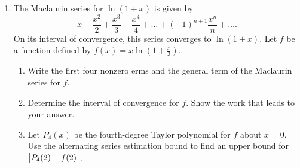 \begin{enumerate}
	\item The Maclaurin series for $\ln{(1+x)}$ is given by
		\begin{equation*}
			x - \frac{x^2}{2} + \frac{x^3}{3} - \frac{x^4}{4} + \ldots + (-1)^{n+1}\frac{x^n}{n} + \ldots .
		\end{equation*}
		On its interval of convergence, this series converges to $\ln{(1+x)}$.
		Let $f$ be a function defined by $f(x) = x\ln{\left(1+\frac{x}{3}\right)}$.
		\begin{enumerate}
			\item Write the first four nonzero erms and the general term of the Maclaurin series for $f$.
			\item Determine the interval of convergence for $f$.
				Show the work that leads to your answer.
			\item Let $P_4(x)$ be the fourth-degree Taylor polynomial for $f$ about $x=0$.
				Use the alternating series estimation bound to find an upper bound for $\big\lvert P_4(2)-f(2) \big\rvert$.
		\end{enumerate}
	
\end{enumerate}